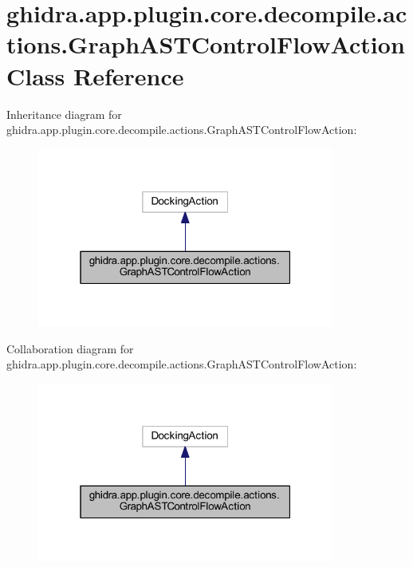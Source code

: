 \hypertarget{classghidra_1_1app_1_1plugin_1_1core_1_1decompile_1_1actions_1_1_graph_a_s_t_control_flow_action}{}\section{ghidra.\+app.\+plugin.\+core.\+decompile.\+actions.\+Graph\+A\+S\+T\+Control\+Flow\+Action Class Reference}
\label{classghidra_1_1app_1_1plugin_1_1core_1_1decompile_1_1actions_1_1_graph_a_s_t_control_flow_action}


Inheritance diagram for ghidra.\+app.\+plugin.\+core.\+decompile.\+actions.\+Graph\+A\+S\+T\+Control\+Flow\+Action\+:
\nopagebreak
\begin{figure}[H]
\begin{center}
\leavevmode
\includegraphics[width=277pt]{classghidra_1_1app_1_1plugin_1_1core_1_1decompile_1_1actions_1_1_graph_a_s_t_control_flow_action__inherit__graph}
\end{center}
\end{figure}


Collaboration diagram for ghidra.\+app.\+plugin.\+core.\+decompile.\+actions.\+Graph\+A\+S\+T\+Control\+Flow\+Action\+:
\nopagebreak
\begin{figure}[H]
\begin{center}
\leavevmode
\includegraphics[width=277pt]{classghidra_1_1app_1_1plugin_1_1core_1_1decompile_1_1actions_1_1_graph_a_s_t_control_flow_action__coll__graph}
\end{center}
\end{figure}

